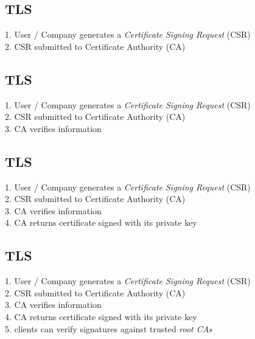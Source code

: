 \documentclass[xga]{xdvislides}
\begin{document}
\subsection{TLS}
1. User / Company generates a {\em Certificate Signing Request} (CSR) \\

2. CSR submitted to Certificate Authority (CA) \\

\subsection{TLS}
1. User / Company generates a {\em Certificate Signing Request} (CSR) \\

2. CSR submitted to Certificate Authority (CA) \\

3. CA verifies information \\

\subsection{TLS}
1. User / Company generates a {\em Certificate Signing Request} (CSR) \\

2. CSR submitted to Certificate Authority (CA) \\

3. CA verifies information \\

4. CA returns certificate signed with its private key \\

\subsection{TLS}
1. User / Company generates a {\em Certificate Signing Request} (CSR) \\

2. CSR submitted to Certificate Authority (CA) \\

3. CA verifies information \\

4. CA returns certificate signed with its private key \\

5. clients can verify signatures against trusted {\em root CAs} \\
\end{document}

